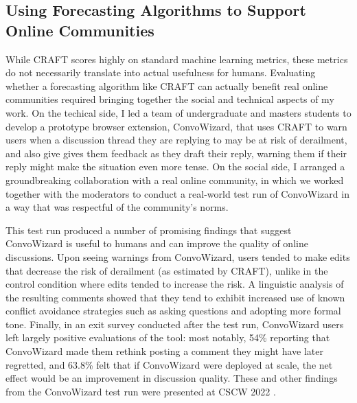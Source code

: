 \documentclass[11pt,letterpaper]{article}
\begin{document}
\subsection{Using Forecasting Algorithms to Support Online Communities}
While CRAFT scores highly on standard machine learning metrics, these metrics do not necessarily translate into actual usefulness for humans.
Evaluating whether a forecasting algorithm like CRAFT can actually benefit real online communities required bringing together the social and technical aspects of my work.
On the techical side, I led a team of undergraduate and masters students to develop a prototype browser extension, ConvoWizard, that uses CRAFT to warn users when a discussion thread they are replying to may be at risk of derailment, and also give gives them feedback as they draft their reply, warning them if their reply might make the situation even more tense.
On the social side, I arranged a groundbreaking collaboration with a real online community, in which we worked together with the moderators to conduct a real-world test run of ConvoWizard in a way that was respectful of the community's norms.

This test run produced a number of promising findings that suggest ConvoWizard is useful to humans and can improve the quality of online discussions.
Upon seeing warnings from ConvoWizard, users tended to make edits that decrease the risk of derailment (as estimated by CRAFT), unlike in the control condition where edits tended to increase the risk.
A linguistic analysis of the resulting comments showed that they tend to exhibit increased use of known conflict avoidance strategies such as asking questions and adopting more formal tone.
Finally, in an exit survey conducted after the test run, ConvoWizard users left largely positive evaluations of the tool: most notably, 54\% reporting that ConvoWizard made them rethink posting a comment they might have later regretted, and 63.8\% felt that if ConvoWizard were deployed at scale, the net effect would be an improvement in discussion quality.
These and other findings from the ConvoWizard test run were presented at CSCW 2022 \cite{chang_thread_2022}.
\end{document}
